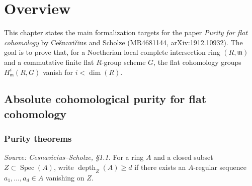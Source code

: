 \chapter{Overview}
\label{chap:overview}


\providecommand{\Spec}{\operatorname{Spec}}
\providecommand{\vdim}{\operatorname{vdim}}
\providecommand{\Br}{\operatorname{Br}}
\providecommand{\depth}{\operatorname{depth}}
\providecommand{\fm}{\mathfrak{m}}
\providecommand{\AInf}{\mathbb{A}_{\mathrm{Inf}}}
\providecommand{\Gm}{\mathbb{G}_{m}}
\providecommand{\Zp}{\mathbb{Z}_{p}}
\providecommand{\Fp}{\mathbb{F}_{p}}
\providecommand{\wh}[1]{\widehat{#1}}
\providecommand{\wt}[1]{\widetilde{#1}}

This chapter states the main formalization targets for the paper \textit{Purity for flat cohomology} by Ce\v{s}navi\v{c}ius and Scholze (MR4681144, arXiv:1912.10932). The goal is to prove that, for a Noetherian local complete intersection ring \((R, \mathfrak{m})\) and a commutative finite flat \(R\)-group scheme \(G\), the flat cohomology groups \(H^i_{\mathfrak{m}}(R, G)\) vanish for \(i < \dim(R)\).


\section{Absolute cohomological purity for flat cohomology}

\subsection{Purity theorems}

\begin{definition}
  \label{def:depth_Z}
  \uses{}
  \textit{Source: Cesnavicius--Scholze, §1.1.}
  For a ring \(A\) and a closed subset \(Z \subset \operatorname{Spec}(A)\), write \(\operatorname{depth}_Z(A) \ge d\) if there exists an \(A\)-regular sequence \(a_1, \ldots, a_d \in A\) vanishing on \(Z\).
\end{definition}

